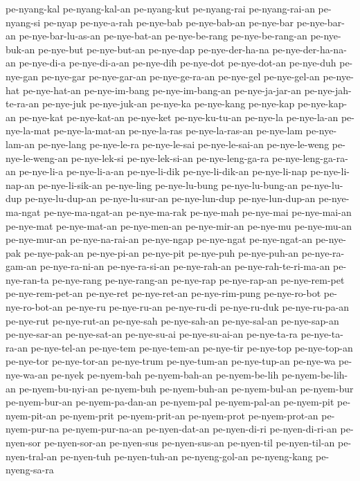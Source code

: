 {pe-nyang-kal pe-nyang-kal-an pe-nyang-kut pe-nyang-rai pe-nyang-rai-an
pe-nyang-si pe-nyap pe-nye-a-rah pe-nye-bab pe-nye-bab-an pe-nye-bar
pe-nye-bar-an pe-nye-bar-lu-as-an pe-nye-bat-an pe-nye-be-rang
pe-nye-be-rang-an pe-nye-buk-an pe-nye-but pe-nye-but-an pe-nye-dap
pe-nye-der-ha-na pe-nye-der-ha-na-an pe-nye-di-a pe-nye-di-a-an pe-nye-dih
pe-nye-dot pe-nye-dot-an pe-nye-duh pe-nye-gan pe-nye-gar pe-nye-gar-an
pe-nye-ge-ra-an pe-nye-gel pe-nye-gel-an pe-nye-hat pe-nye-hat-an
pe-nye-im-bang pe-nye-im-bang-an pe-nye-ja-jar-an pe-nye-jah-te-ra-an
pe-nye-juk pe-nye-juk-an pe-nye-ka pe-nye-kang pe-nye-kap pe-nye-kap-an
pe-nye-kat pe-nye-kat-an pe-nye-ket pe-nye-ku-tu-an pe-nye-la pe-nye-la-an
pe-nye-la-mat pe-nye-la-mat-an pe-nye-la-ras pe-nye-la-ras-an pe-nye-lam
pe-nye-lam-an pe-nye-lang pe-nye-le-ra pe-nye-le-sai pe-nye-le-sai-an
pe-nye-le-weng pe-nye-le-weng-an pe-nye-lek-si pe-nye-lek-si-an
pe-nye-leng-ga-ra pe-nye-leng-ga-ra-an pe-nye-li-a pe-nye-li-a-an
pe-nye-li-dik pe-nye-li-dik-an pe-nye-li-nap pe-nye-li-nap-an
pe-nye-li-sik-an pe-nye-ling pe-nye-lu-bung pe-nye-lu-bung-an
pe-nye-lu-dup pe-nye-lu-dup-an pe-nye-lu-sur-an pe-nye-lun-dup
pe-nye-lun-dup-an pe-nye-ma-ngat pe-nye-ma-ngat-an pe-nye-ma-rak
pe-nye-mah pe-nye-mai pe-nye-mai-an pe-nye-mat pe-nye-mat-an pe-nye-men-an
pe-nye-mir-an pe-nye-mu pe-nye-mu-an pe-nye-mur-an pe-nye-na-rai-an
pe-nye-ngap pe-nye-ngat pe-nye-ngat-an pe-nye-pak pe-nye-pak-an
pe-nye-pi-an pe-nye-pit pe-nye-puh pe-nye-puh-an pe-nye-ra-gam-an
pe-nye-ra-ni-an pe-nye-ra-si-an pe-nye-rah-an pe-nye-rah-te-ri-ma-an
pe-nye-ran-ta pe-nye-rang pe-nye-rang-an pe-nye-rap pe-nye-rap-an
pe-nye-rem-pet pe-nye-rem-pet-an pe-nye-ret pe-nye-ret-an pe-nye-rim-pung
pe-nye-ro-bot pe-nye-ro-bot-an pe-nye-ru pe-nye-ru-an pe-nye-ru-di
pe-nye-ru-duk pe-nye-ru-pa-an pe-nye-rut pe-nye-rut-an pe-nye-sah
pe-nye-sah-an pe-nye-sal-an pe-nye-sap-an pe-nye-sar-an pe-nye-sat-an
pe-nye-su-ai pe-nye-su-ai-an pe-nye-ta-ra pe-nye-ta-ra-an pe-nye-tel-an
pe-nye-tem pe-nye-tem-an pe-nye-tir pe-nye-top pe-nye-top-an pe-nye-tor
pe-nye-tor-an pe-nye-trum pe-nye-tum-an pe-nye-tup-an pe-nye-wa
pe-nye-wa-an pe-nyek pe-nyem-bah pe-nyem-bah-an pe-nyem-be-lih
pe-nyem-be-lih-an pe-nyem-bu-nyi-an pe-nyem-buh pe-nyem-buh-an
pe-nyem-bul-an pe-nyem-bur pe-nyem-bur-an pe-nyem-pa-dan-an pe-nyem-pal
pe-nyem-pal-an pe-nyem-pit pe-nyem-pit-an pe-nyem-prit pe-nyem-prit-an
pe-nyem-prot pe-nyem-prot-an pe-nyem-pur-na pe-nyem-pur-na-an
pe-nyen-dat-an pe-nyen-di-ri pe-nyen-di-ri-an pe-nyen-sor pe-nyen-sor-an
pe-nyen-sus pe-nyen-sus-an pe-nyen-til pe-nyen-til-an pe-nyen-tral-an
pe-nyen-tuh pe-nyen-tuh-an pe-nyeng-gol-an pe-nyeng-kang pe-nyeng-sa-ra
}

